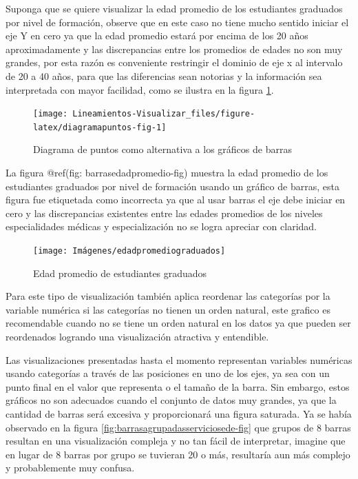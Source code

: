 \documentclass[
]{book}
\begin{document}
Suponga que se quiere visualizar la edad promedio de los estudiantes graduados por nivel de formación, observe que en este caso no tiene mucho sentido iniciar el eje Y en cero ya que la edad promedio estará por encima de los 20 años aproximadamente y las discrepancias entre los promedios de edades no son muy grandes, por esta razón es conveniente restringir el dominio de eje x al intervalo de 20 a 40 años, para que las diferencias sean notorias y la información sea interpretada con mayor facilidad, como se ilustra en la figura \ref{fig:diagramapuntos-fig}.

\begin{figure}

{\centering \texttt{[image: Lineamientos-Visualizar\_files/figure-latex/diagramapuntos-fig-1]} 

}

\caption{Diagrama de puntos como alternativa a los gráficos de barras}\label{fig:diagramapuntos-fig}
\end{figure}

La figura @ref(fig: barrasedadpromedio-fig) muestra la edad promedio de los estudiantes graduados por nivel de formación usando un gráfico de barras, esta figura fue etiquetada como incorrecta ya que al usar barras el eje debe iniciar en cero y las discrepancias existentes entre las edades promedios de los niveles especialidades médicas y especialización no se logra apreciar con claridad.

\begin{figure}

{\centering \texttt{[image: Imágenes/edadpromediograduados]} 

}

\caption{Edad promedio de estudiantes graduados}\label{fig:barrasedadpromedio-fig}
\end{figure}

Para este tipo de visualización también aplica reordenar las categorías por la variable numérica si las categorías no tienen un orden natural, este grafico es recomendable cuando no se tiene un orden natural en los datos ya que pueden ser reordenados logrando una visualización atractiva y entendible.

Las visualizaciones presentadas hasta el momento representan variables numéricas usando categorías a través de las posiciones en uno de los ejes, ya sea con un punto final en el valor que representa o el tamaño de la barra. Sin embargo, estos gráficos no son adecuados cuando el conjunto de datos muy grandes, ya que la cantidad de barras será excesiva y proporcionará una figura saturada. Ya se había observado en la figura \ref{fig:barrasagrupadasserviciosede-fig} que grupos de 8 barras resultan en una visualización compleja y no tan fácil de interpretar, imagine que en lugar de 8 barras por grupo se tuvieran 20 o más, resultaría aun más complejo y probablemente muy confusa.
\end{document}
